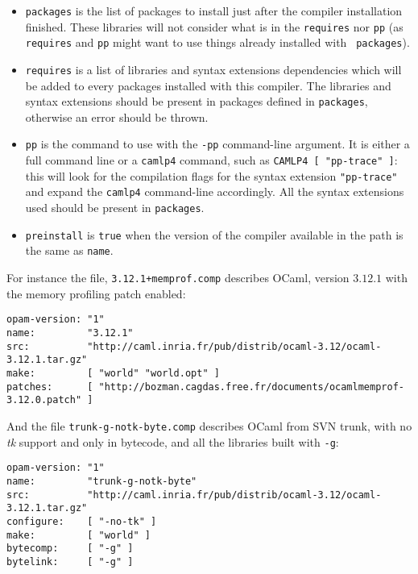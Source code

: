 \documentclass[a4paper,11pt]{article}
\begin{document}
\begin{itemize}
\item {\tt packages} is the list of packages to install just after the
  compiler installation finished. These libraries will not consider
  what is in the {\tt requires} nor {\tt pp} (as {\tt requires} and
  {\tt pp} might want to use things already installed with {\tt
    packages}).

\item {\tt requires} is a list of libraries and syntax extensions
  dependencies which will be added to every packages installed with
  this compiler. The libraries and syntax extensions should be present
  in packages defined in {\tt packages}, otherwise an error should be
  thrown.

\item {\tt pp} is the command to use with the {\tt -pp} command-line
  argument. It is either a full command line or a {\tt camlp4} command,
  such as \verb+CAMLP4 [ "pp-trace" ]+: this will look for the
  compilation flags for the syntax extension \verb+"pp-trace"+ and expand
  the {\tt camlp4} command-line accordingly. All the syntax extensions used
  should be present in {\tt packages}.

\item {\tt preinstall} is {\tt true} when the version of the compiler available
  in the path is the same as {\tt name}.
\end{itemize}

For instance the file, {\tt 3.12.1+memprof.comp} describes OCaml,
version $3.12.1$ with the memory profiling patch enabled:

\begin{verbatim}
opam-version: "1"
name:         "3.12.1"
src:          "http://caml.inria.fr/pub/distrib/ocaml-3.12/ocaml-3.12.1.tar.gz"
make:         [ "world" "world.opt" ]
patches:      [ "http://bozman.cagdas.free.fr/documents/ocamlmemprof-3.12.0.patch" ]
\end{verbatim}

And the file {\tt trunk-g-notk-byte.comp} describes OCaml from SVN
trunk, with no {\em tk} support and only in bytecode, and all the
libraries built with {\tt -g}:

\begin{verbatim}
opam-version: "1"
name:         "trunk-g-notk-byte"
src:          "http://caml.inria.fr/pub/distrib/ocaml-3.12/ocaml-3.12.1.tar.gz"
configure:    [ "-no-tk" ]
make:         [ "world" ]
bytecomp:     [ "-g" ]
bytelink:     [ "-g" ]
\end{verbatim}
\end{document}

